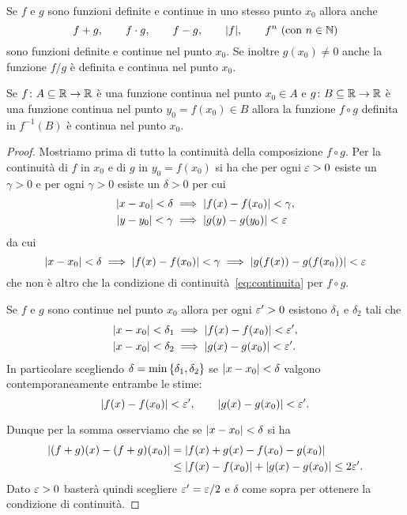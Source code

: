 \begin{theorem}
\label{th:continuita_composizione}
Se $f$ e $g$ sono funzioni definite e continue
in uno stesso punto $x_0$
allora anche
\[
  f+g, \qquad
  f\cdot g, \qquad
  f-g, \qquad
  {\left|f\right|}, \qquad
  f^n\ \text{(con $n\in \mathbb N$)}
\]
sono funzioni definite e continue nel punto $x_0$.
Se inoltre $g(x_0)\neq 0$ anche la funzione
$f/g$
è definita e continua nel punto $x_0$.

Se $f\colon A\subseteq \mathbb R \to \mathbb R$ è una funzione continua
nel punto $x_0\in A$ e
$g\colon B\subseteq \mathbb R \to \mathbb R$ è una funzione
continua nel punto $y_0=f(x_0)\in B$ allora la funzione $f\circ g$
definita in $f^{-1}(B)$ è continua nel punto $x_0$.
\end{theorem}
%
\begin{proof}
Mostriamo prima di tutto la continuità
della composizione $f\circ g$.
Per la continuità di $f$ in $x_0$ e di $g$ in $y_0=f(x_0)$
si ha che per ogni $\varepsilon>0$ esiste un $\gamma>0$
e per ogni $\gamma>0$ esiste un $\delta>0$ per cui
\begin{align*}
 {\left|x-x_0\right|}< \delta &\implies {\left|f(x)-f(x_0)\right|}<\gamma,\\
 {\left|y-y_0\right|}< \gamma & \implies {\left|g(y)-g(y_0)\right|}<\varepsilon
\end{align*}
da cui
\[
{\left|x-x_0\right|}< \delta
\implies {\left|f(x)-f(x_0)\right|}< \gamma
\implies {\left|g(f(x))-g(f(x_0))\right|} < \varepsilon
\]
che non è altro che la condizione di
continuità~\eqref{eq:continuita} per $f\circ g$.

Se $f$ e $g$ sono continue nel punto $x_0$
allora per ogni $\varepsilon'>0$ esistono $\delta_1$
e $\delta_2$ tali che
\begin{align*}
 {\left|x-x_0\right|} < \delta_1 &\implies {\left|f(x)-f(x_0)\right|} < \varepsilon',
 \\
 {\left|x-x_0\right|} < \delta_2 &\implies {\left|g(x)-g(x_0)\right|} < \varepsilon'.
\end{align*}
In particolare scegliendo $\delta = \min{\left\{ \delta_1,\delta_2 \right\}}$
se ${\left|x-x_0\right|} < \delta$ valgono contemporaneamente
entrambe le stime:
\[
 {\left|f(x)-f(x_0)\right|}< \varepsilon', \qquad
 {\left|g(x)-g(x_0)\right|}< \varepsilon'.
\]

Dunque per la somma osserviamo che se ${\left|x-x_0\right|}<\delta$
si ha
\begin{align*}
 {\left|(f+g)(x) - (f+g)(x_0)\right|}
  &= {\left|f(x)+g(x)-f(x_0)-g(x_0)\right|}\\
  &\le {\left|f(x)-f(x_0)\right|} + {\left|g(x)-g(x_0)\right|}
  \le 2 \varepsilon'.
\end{align*}
Dato $\varepsilon>0$ basterà quindi scegliere $\varepsilon' = \varepsilon / 2$
e $\delta$ come sopra per ottenere la condizione di continuità.


\end{proof}
